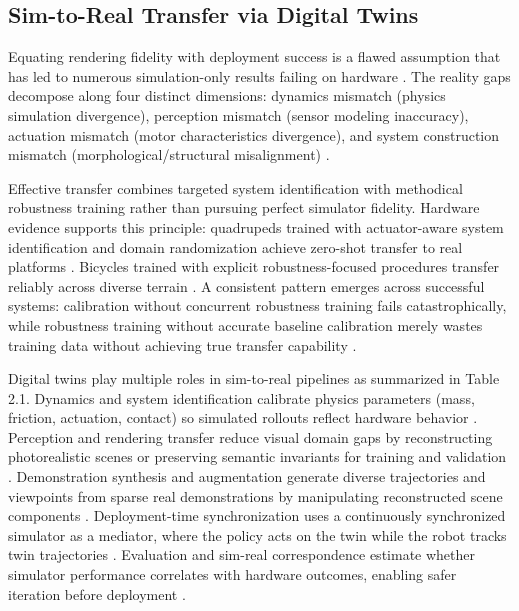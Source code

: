 \documentclass[12pt,a4paper,oneside]{report}
\begin{document}
\subsection{Sim-to-Real Transfer via Digital Twins}

Equating rendering fidelity with deployment success is a flawed assumption that has led to numerous simulation-only results failing on hardware \cite{aljalbout2026realitygap}. The reality gaps decompose along four distinct dimensions: dynamics mismatch (physics simulation divergence), perception mismatch (sensor modeling inaccuracy), actuation mismatch (motor characteristics divergence), and system construction mismatch (morphological/structural misalignment) \cite{aljalbout2026realitygap, tan2018simtoreal}.

Effective transfer combines targeted system identification with methodical robustness training rather than pursuing perfect simulator fidelity. Hardware evidence supports this principle: quadrupeds trained with actuator-aware system identification and domain randomization achieve zero-shot transfer to real platforms \cite{tan2018simtoreal}. Bicycles trained with explicit robustness-focused procedures transfer reliably across diverse terrain \cite{liu2024cyclerl}. A consistent pattern emerges across successful systems: calibration without concurrent robustness training fails catastrophically, while robustness training without accurate baseline calibration merely wastes training data without achieving true transfer capability \cite{tan2018simtoreal, aljalbout2026realitygap}.

Digital twins play multiple roles in sim-to-real pipelines as summarized in Table 2.1. Dynamics and system identification calibrate physics parameters (mass, friction, actuation, contact) so simulated rollouts reflect hardware behavior \cite{tan2018simtoreal, heiden2022inferring, lou2026drex}. Perception and rendering transfer reduce visual domain gaps by reconstructing photorealistic scenes or preserving semantic invariants for training and validation \cite{qureshi2025splatsim, tang2025semantic}. Demonstration synthesis and augmentation generate diverse trajectories and viewpoints from sparse real demonstrations by manipulating reconstructed scene components \cite{yang2025robosplat, yu2025real2render2real}. Deployment-time synchronization uses a continuously synchronized simulator as a mediator, where the policy acts on the twin while the robot tracks twin trajectories \cite{abou2024realissim}. Evaluation and sim-real correspondence estimate whether simulator performance correlates with hardware outcomes, enabling safer iteration before deployment \cite{jain2025polaris, li2024simpler}.
\end{document}
